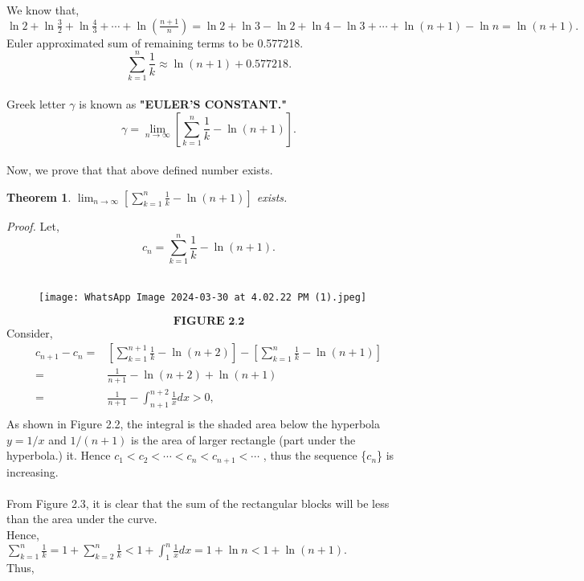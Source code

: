 \documentclass[a4paper,reqno,11pt]{book}
\theoremstyle{plain}%
\newtheorem{thm}{Theorem}[chapter]
\theoremstyle{definition}
\begin{document}
We know that,\\
$ \ln2 + \ln\frac{3}{2} + \ln\frac{4}{3} + \cdots + \ln(\frac{n+1}{n}) = \ln2 + \ln3 -\ln2 + \ln4 - \ln3 + \cdots + \ln(n+1) - \ln n = \ln(n+1) . $\\
Euler approximated sum of remaining terms to be 0.577218.
\\
$$ \sum_{k=1}^{n} \frac{1}{k} \approx \ln(n+1) + 0.577218. $$ \\
Greek letter $\gamma$ is known as \textbf{"EULER'S CONSTANT."}\\
$$ \gamma = \lim_{n\to\infty}[\sum_{k=1}^{n} \frac{1}{k} - \ln(n+1) ].$$\\
Now, we prove that that above defined number exists.\\
\begin{thm}\label{thm:Type 1}  $ \lim_{n\to\infty}[\sum_{k=1}^{n} \frac{1}{k} - \ln(n+1) ]$ exists.\\
\end{thm}
\noindent \textit{Proof.}  Let,\\
$$  c_{n} = \sum_{k=1}^{n} \frac{1}{k} - \ln(n+1). $$\\
\begin{figure}
    \centering
    \texttt{[image: WhatsApp Image 2024-03-30 at 4.02.22 PM (1).jpeg]}
\end{figure}
$$\textbf{FIGURE 2.2}$$
Consider,
\begin{align*}
c_{n+1} - c_{n}  =& [\sum_{k=1}^{n+1} \frac{1}{k} - \ln(n+2)] - [\sum_{k=1}^{n} \frac{1}{k} - \ln(n+1)] \\
 =&  \frac{1}{n+1} - \ln(n+2) + \ln(n+1) \\
=& \frac{1}{n+1} - \int_{n+1}^{n+2}\frac{1}{x}dx > 0,\\
\end{align*}
As shown in Figure 2.2, the integral is the shaded area below the hyperbola $y = 1/x$   and $1/(n + 1)$ is the area of larger rectangle (part under the hyperbola.)
it. Hence $c_{1} < c_{2} < \cdots < c_{n} < c_{n+1}
 < \cdots$ , thus the sequence \{$c_{n}$\} is 
increasing.\\
\\
From Figure 2.3, it is clear that the sum of the rectangular blocks 
will be less than the  area under the curve.\\
Hence,\\
$\sum_{k=1}^{n}\frac{1}{k} = 1 + \sum_{k=2}^{n}\frac{1}{k}  < 1 + \int_{1}^{n}\frac{1}{x}dx = 1 + \ln n < 1 + \ln (n+1).$\\
Thus,\\
\end{document}
